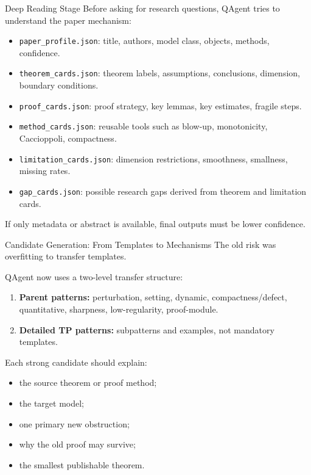 \documentclass[aspectratio=169,11pt]{beamer}
\begin{document}
\begin{frame}{Deep Reading Stage}
  Before asking for research questions, QAgent tries to understand the paper mechanism:
  \begin{itemize}
    \item \texttt{paper\_profile.json}: title, authors, model class, objects, methods, confidence.
    \item \texttt{theorem\_cards.json}: theorem labels, assumptions, conclusions, dimension, boundary conditions.
    \item \texttt{proof\_cards.json}: proof strategy, key lemmas, key estimates, fragile steps.
    \item \texttt{method\_cards.json}: reusable tools such as blow-up, monotonicity, Caccioppoli, compactness.
    \item \texttt{limitation\_cards.json}: dimension restrictions, smoothness, smallness, missing rates.
    \item \texttt{gap\_cards.json}: possible research gaps derived from theorem and limitation cards.
  \end{itemize}

  \vspace{0.4em}
  If only metadata or abstract is available, final outputs must be lower confidence.
\end{frame}

\begin{frame}{Candidate Generation: From Templates to Mechanisms}
  The old risk was overfitting to transfer templates.

  \vspace{0.5em}
  QAgent now uses a two-level transfer structure:
  \begin{enumerate}
    \item \textbf{Parent patterns:} perturbation, setting, dynamic, compactness/defect, quantitative, sharpness, low-regularity, proof-module.
    \item \textbf{Detailed TP patterns:} subpatterns and examples, not mandatory templates.
  \end{enumerate}

  \vspace{0.5em}
  Each strong candidate should explain:
  \begin{itemize}
    \item the source theorem or proof method;
    \item the target model;
    \item one primary new obstruction;
    \item why the old proof may survive;
    \item the smallest publishable theorem.
  \end{itemize}
\end{frame}
\end{document}
